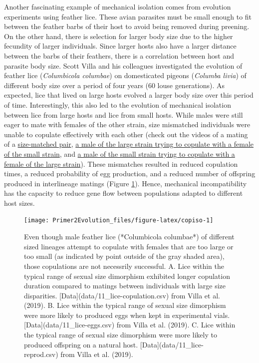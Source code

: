 \documentclass[
]{book}
\begin{document}
Another fascinating example of mechanical isolation comes from evolution experiments using feather lice. These avian parasites must be small enough to fit between the feather barbs of their host to avoid being removed during preening. On the other hand, there is selection for larger body size due to the higher fecundity of larger individuals. Since larger hosts also have a larger distance between the barbs of their feathers, there is a correlation between host and parasite body size. Scott Villa and his colleagues investigated the evolution of feather lice (\emph{Columbicola columbae}) on domesticated pigeons (\emph{Columba livia}) of different body size over a period of four years (60 louse generations). As expected, lice that lived on large hosts evolved a larger body size over this period of time. Interestingly, this also led to the evolution of mechanical isolation between lice from large hosts and lice from small hosts. While males were still eager to mate with females of the other strain, size mismatched individuals were unable to copulate effectively with each other (check out the videos of a mating of a \href{https://movie-usa.glencoesoftware.com/video/10.1073/pnas.1901247116/video-1}{size-matched pair}, \href{https://movie-usa.glencoesoftware.com/video/10.1073/pnas.1901247116/video-2}{a male of the large strain trying to copulate with a female of the small strain}, and \href{https://movie-usa.glencoesoftware.com/video/10.1073/pnas.1901247116/video-3}{a male of the small strain trying to copulate with a female of the large strain}). These mismatches resulted in reduced copulation times, a reduced probability of egg production, and a reduced number of offspring produced in interlineage matings (Figure \ref{fig:copiso}). Hence, mechanical incompatibility has the capacity to reduce gene flow between populations adapted to different host sizes.

\begin{figure}
\texttt{[image: Primer2Evolution\_files/figure-latex/copiso-1]} \caption{Even though male feather lice (*Columbicola columbae*) of different sized lineages attempt to copulate with females that are too large or too small (as indicated by point outside of the gray shaded area), those copulations are not necessrily successful. A. Lice within the typical range of sexual size dimorphism exhibited longer copulation duration compared to matings between individuals with large size disparities. [Data](data/11_lice-copulation.csv) from Villa et al. (2019). B. Lice within the typical range of sexual size dimorphism were more likely to produced eggs when kept in experimental vials. [Data](data/11_lice-eggs.csv) from Villa et al. (2019). C. Lice within the typical range of sexual size dimorphism were more likely to produced offspring on a natural host. [Data](data/11_lice-reprod.csv) from Villa et al. (2019).}\label{fig:copiso}
\end{figure}
\end{document}
